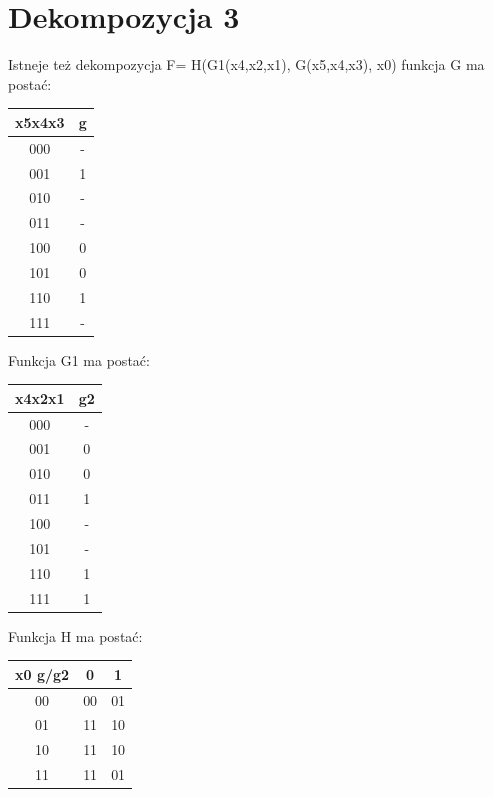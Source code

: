 \documentclass[]{article}
\begin{document}
\section{Dekompozycja 3}
 Istneje też dekompozycja F= H(G1(x4,x2,x1), G(x5,x4,x3), x0)
\newline
funkcja G ma postać:
\newline
\newline
\begin{tabular}[]{|c|c|}
\hline
   \footnotesize{x5x4x3} & \footnotesize{g}\\
\hline   
   000 & -\\
   001 & 1\\
   010 & -\\
   011 & -\\
   100 & 0\\
   101 & 0\\
   110 & 1\\
   111 & -\\
\hline
\end{tabular}
\newline
\newline
Funkcja G1 ma postać:
\newline
\newline
\begin{tabular}[]{|c|c|}
\hline
   \footnotesize{x4x2x1} & \footnotesize{g2}\\
\hline   
   000 & -\\
   001 & 0\\
   010 & 0\\
   011 & 1\\
   100 & -\\
   101 & -\\
   110 & 1\\
   111 & 1\\
\hline
\end{tabular}
\newline
\newline
Funkcja H ma postać:
\newline
\newline
\begin{tabular}[]{|c|c|c|}
\hline
   \footnotesize{x0 g/g2} & \footnotesize{0} & \footnotesize{1}\\
\hline   
   00 & 00 & 01\\
   01 & 11 & 10\\
   10 & 11 & 10\\
   11 & 11 & 01\\
\hline
\end{tabular}
\end{document}

